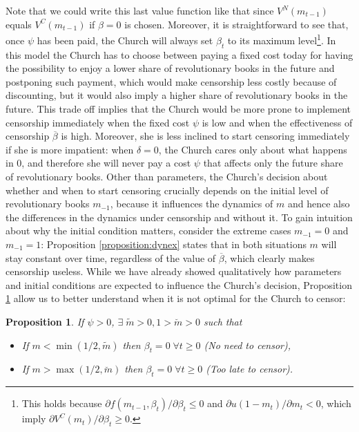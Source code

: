 \documentclass[12pt]{article}
\newtheorem{proposition}{Proposition}
\begin{document}
Note that we could write this last value function like that since $V^N(m_{t-1})$ equals $V^C(m_{t-1})$ if $\beta=0$ is chosen. Moreover, it is straightforward to see that, once $\psi$ has been paid, the Church will always set $\beta_t$ to its maximum level\footnote{This holds because $\partial f(m_{t-1},\beta_t)/\partial\beta_t\leq 0$ and $\partial u(1-m_t)/\partial m_t<0$, which imply $\partial V^C(m_t)/\partial \beta_t\geq 0$.}. In this model the Church has to choose between paying a fixed cost today for having the possibility to enjoy a lower share of revolutionary books in the future and postponing such payment, which would make censorship less costly because of discounting, but it would also imply a higher share of revolutionary books in the future. This trade off implies that the Church would be more prone to implement censorship immediately when the fixed cost $\psi$ is low and when the effectiveness of censorship $\overline{\beta}$ is high. Moreover, she is less inclined to start censoring immediately if she is more impatient: when $\delta=0$, the Church cares only about what happens in 0, and therefore she will never pay a cost $\psi$ that affects only the future share of revolutionary books.
Other than parameters, the Church's decision about whether and when to start censoring crucially depends on the initial level of revolutionary books $m_{-1}$, because it influences the dynamics of $m$ and hence also the differences in the dynamics under censorship and without it. To gain intuition about why the initial condition matters, consider the extreme cases $m_{-1}=0$ and $m_{-1}=1$: Proposition \ref{proposition:dynex} states that in both situations $m$ will stay constant over time, regardless of the value of $\overline{\beta}$, which clearly makes censorship useless.
While we have already showed qualitatively how parameters and initial conditions are expected to influence the Church's decision, Proposition \ref{proposition:tooLate} allow us to better understand when it is not optimal for the Church to censor:
\begin{proposition}
\label{proposition:tooLate}
If $\psi>0$, $\exists\;\tilde{m}>0,1>\breve{m}>0$ such that
\begin{itemize}
\item[i)] If $m<\min(1/2,\tilde{m})$ then $\beta_t=0\;\forall t\geq0$ (No need to censor),
\item[ii)] If $m>\max(1/2,\breve{m})$ then $\beta_t=0\;\forall t\geq0$ (Too late to censor).
\end{itemize}
\end{proposition}
\end{document}

